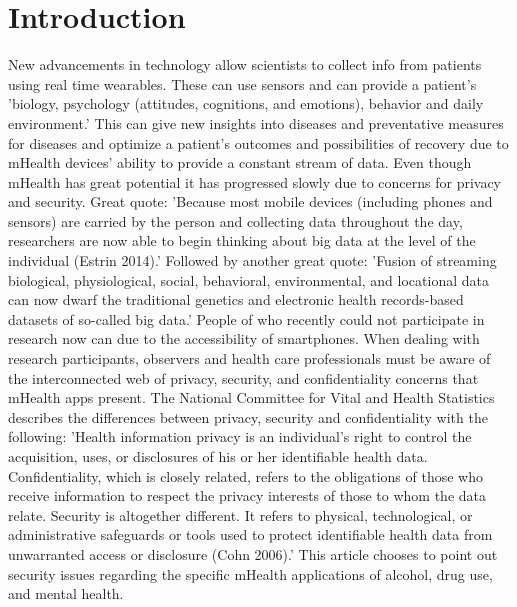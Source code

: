 \documentclass{article}
\begin{document}
\section*{Introduction}
New advancements in technology allow scientists to collect info from patients using real time wearables. These can use sensors and can provide a patient's 'biology, psychology (attitudes, cognitions, and emotions), behavior and daily environment.' This can give new insights into diseases and preventative measures for diseases and optimize a patient's outcomes and possibilities of recovery due to mHealth devices' ability to provide a constant stream of data. Even though mHealth has great potential it has progressed slowly due to concerns for privacy and security. Great quote: 'Because most mobile devices (including phones and sensors) are carried by the person and collecting data throughout the day, researchers are now able to begin thinking about big data at the level of the individual (Estrin 2014).' Followed by another great quote: 'Fusion of streaming biological, physiological, social, behavioral, environmental, and locational data can now dwarf the traditional genetics and electronic health records-based datasets of so-called big data.' People of who recently could not participate in research now can due to the accessibility of smartphones. When dealing with research participants, observers and health care professionals must be aware of the interconnected web of privacy, security, and confidentiality concerns that mHealth apps present. The National Committee for Vital and Health Statistics describes the differences between privacy, security and confidentiality with the following: 'Health information privacy is an individual’s right to control the acquisition, uses, or disclosures of his or her identifiable health data. Confidentiality, which is closely related, refers to the obligations of those who receive information to respect the privacy interests of those to whom the data relate. Security is altogether different. It refers to physical, technological, or administrative safeguards or tools used to protect identifiable health data from unwarranted access or disclosure (Cohn 2006).' This article chooses to point out security issues regarding the specific mHealth applications of alcohol, drug use, and mental health. 
\end{document}
